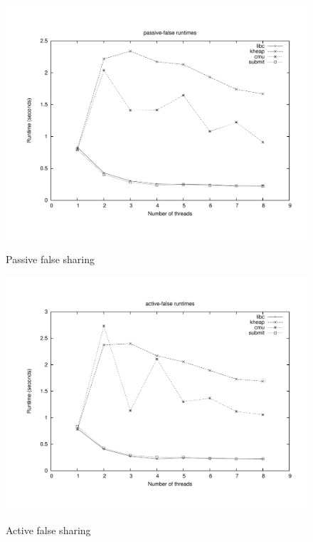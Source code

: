 \documentclass[oneside]{amsart}
\theoremstyle{definition}
\theoremstyle{remark}
\numberwithin{equation}{section}
\begin{document}
\begin{figure}[h]
    \caption{Passive false sharing}
    \centering
    \includegraphics[scale=0.35]{../benchmarks/cache-scratch/cache-scratch.pdf}
    \label{fig:passive-false-sharing}
\end{figure}

\begin{figure}[h]
    \caption{Active false sharing}
    \centering
    \includegraphics[scale=0.35]{../benchmarks/cache-thrash/cache-thrash.pdf}
    \label{fig:active-false-sharing}
\end{figure}

\newpage 
\end{document}
